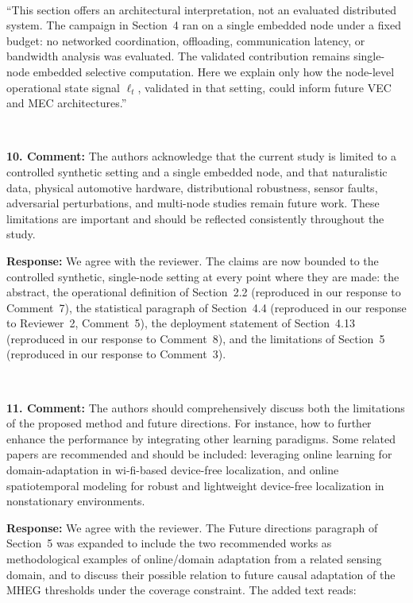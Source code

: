 \documentclass[1p,12pt,authoryear]{elsarticle}
\begin{document}
~

``This section offers an architectural interpretation, not an evaluated distributed system. The campaign in Section~4 ran on a single embedded node under a fixed budget: no networked coordination, offloading, communication latency, or bandwidth analysis was evaluated. The validated contribution remains single-node embedded selective computation. Here we explain only how the node-level operational state signal $\ell_t$, validated in that setting, could inform future VEC and MEC architectures.''

~

\noindent \textbf{10. Comment:} The authors acknowledge that the current study is limited to a controlled synthetic setting and a single embedded node, and that naturalistic data, physical automotive hardware, distributional robustness, sensor faults, adversarial perturbations, and multi-node studies remain future work. These limitations are important and should be reflected consistently throughout the study.

\vspace{2mm}
\noindent \textbf{Response:} We agree with the reviewer. The claims are now bounded to the controlled synthetic, single-node setting at every point where they are made: the abstract, the operational definition of Section~2.2 (reproduced in our response to Comment~7), the statistical paragraph of Section~4.4 (reproduced in our response to Reviewer~2, Comment~5), the deployment statement of Section~4.13 (reproduced in our response to Comment~8), and the limitations of Section~5 (reproduced in our response to Comment~3).

~

\noindent \textbf{11. Comment:} The authors should comprehensively discuss both the limitations of the proposed method and future directions. For instance, how to further enhance the performance by integrating other learning paradigms. Some related papers are recommended and should be included: leveraging online learning for domain-adaptation in wi-fi-based device-free localization, and online spatiotemporal modeling for robust and lightweight device-free localization in nonstationary environments.

\vspace{2mm}
\noindent \textbf{Response:} We agree with the reviewer. The Future directions paragraph of Section~5 was expanded to include the two recommended works as methodological examples of online/domain adaptation from a related sensing domain, and to discuss their possible relation to future causal adaptation of the MHEG thresholds under the coverage constraint. The added text reads:
\end{document}

